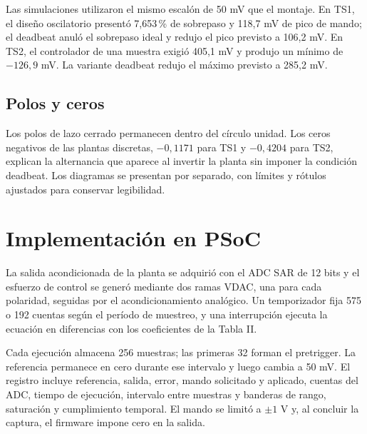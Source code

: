 \documentclass[10pt,twocolumn]{article}
\begin{document}
\begin{table}[!h]
\centering
\caption{Coeficientes empleados en la implementación}
\end{table}

Las simulaciones utilizaron el mismo escalón de 50 mV que el montaje. En TS1, el diseño oscilatorio presentó 7,653\,\% de sobrepaso y 118,7 mV de pico de mando; el deadbeat anuló el sobrepaso ideal y redujo el pico previsto a 106,2 mV. En TS2, el controlador de una muestra exigió 405,1 mV y produjo un mínimo de \(-126,9\) mV. La variante deadbeat redujo el máximo previsto a 285,2 mV.

\subsection{Polos y ceros}
Los polos de lazo cerrado permanecen dentro del círculo unidad. Los ceros negativos de las plantas discretas, \(-0,1171\) para TS1 y \(-0,4204\) para TS2, explican la alternancia que aparece al invertir la planta sin imponer la condición deadbeat. Los diagramas se presentan por separado, con límites y rótulos ajustados para conservar legibilidad.

\balance
\section{Implementación en PSoC}
La salida acondicionada de la planta se adquirió con el ADC SAR de 12 bits y el esfuerzo de control se generó mediante dos ramas VDAC, una para cada polaridad, seguidas por el acondicionamiento analógico. Un temporizador fija 575 o 192 cuentas según el período de muestreo, y una interrupción ejecuta la ecuación en diferencias con los coeficientes de la Tabla II.

Cada ejecución almacena 256 muestras; las primeras 32 forman el pretrigger. La referencia permanece en cero durante ese intervalo y luego cambia a 50 mV. El registro incluye referencia, salida, error, mando solicitado y aplicado, cuentas del ADC, tiempo de ejecución, intervalo entre muestras y banderas de rango, saturación y cumplimiento temporal. El mando se limitó a \(\pm1\) V y, al concluir la captura, el firmware impone cero en la salida.
\end{document}
